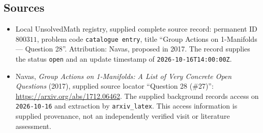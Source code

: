 \documentclass[11pt]{article}
\begin{document}
\subsection{Sources}
\begin{itemize}
\item Local UnsolvedMath registry, supplied complete source record: permanent ID \(800311\), problem code \texttt{catalogue entry}, title ``Group Actions on 1-Manifolds --- Question 28''. Attribution: Navas, proposed in 2017. The record supplies the status \texttt{open} and an update timestamp of \texttt{2026-10-16T14:00:00Z}.
\item Navas, \emph{Group Actions on 1-Manifolds: A List of Very Concrete Open Questions} (2017), supplied source locator ``Question 28 (\#27)'': \url{https://arxiv.org/abs/1712.06462}. The supplied background records access on \texttt{2026-10-16} and extraction by \texttt{arxiv\_latex}. This access information is supplied provenance, not an independently verified visit or literature assessment.
\end{itemize}
\end{document}
